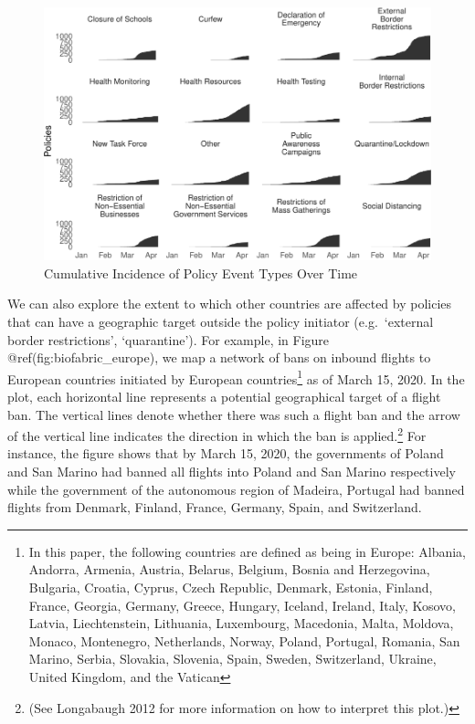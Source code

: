 \documentclass[]{article}
\let\rmarkdownfootnote\footnote%
\def\footnote{\protect\rmarkdownfootnote}
\begin{document}
\begin{figure}
\centering
\includegraphics{corona_wp_files/figure-latex/overtime-1.pdf}
\caption{\label{fig:overtime}Cumulative Incidence of Policy Event Types Over Time}
\end{figure}

We can also explore the extent to which other countries are affected by policies that can have a geographic target outside the policy initiator (e.g.~`external border restrictions', `quarantine'). For example, in Figure @ref(fig:biofabric\_europe), we map a network of bans on inbound flights to European countries initiated by European countries\footnote{In this paper, the following countries are defined as being in Europe: Albania, Andorra, Armenia, Austria, Belarus, Belgium, Bosnia and Herzegovina, Bulgaria, Croatia, Cyprus, Czech Republic, Denmark, Estonia, Finland, France, Georgia, Germany, Greece, Hungary, Iceland, Ireland, Italy, Kosovo, Latvia, Liechtenstein, Lithuania, Luxembourg, Macedonia, Malta, Moldova, Monaco, Montenegro, Netherlands, Norway, Poland, Portugal, Romania, San Marino, Serbia, Slovakia, Slovenia, Spain, Sweden, Switzerland, Ukraine, United Kingdom, and the Vatican} as of March 15, 2020. In the plot, each horizontal line represents a potential geographical target of a flight ban. The vertical lines denote whether there was such a flight ban and the arrow of the vertical line indicates the direction in which the ban is applied.\footnote{(See Longabaugh 2012 for more information on how to interpret this plot.)} For instance, the figure shows that by March 15, 2020, the governments of Poland and San Marino had banned all flights into Poland and San Marino respectively while the government of the autonomous region of Madeira, Portugal had banned flights from Denmark, Finland, France, Germany, Spain, and Switzerland.
\end{document}
